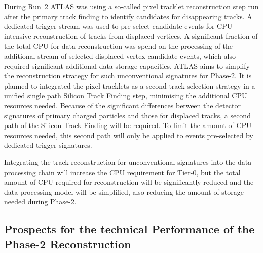During Run~2 ATLAS was using a so-called pixel tracklet reconstruction step run after the primary track finding to identify candidates for disappearing tracks. A dedicated trigger stream was used to pre-select candidate events for CPU intensive reconstruction of tracks from displaced vertices. A significant fraction of the total CPU for data reconstruction was spend on the processing of the additional stream of selected displaced vertex candidate events, which also required significant additional data storage capacities. ATLAS aims to simplify the reconstruction strategy for such unconventional signatures for Phase-2. It is planned to integrated the pixel tracklets as a second track selection strategy in a unified single path Silicon Track Finding step, minimising the additional CPU resources needed. Because of the significant differences between the detector signatures of primary charged particles and those for displaced tracks, a second path of the Silicon Track Finding will be required. To limit the amount of CPU resources needed, this second path will only be applied to events pre-selected by dedicated trigger signatures.

Integrating the track reconstruction for unconventional signatures into the data processing chain will increase the CPU requirement for Tier-0, but the total amount of CPU required for reconstruction will be significantly reduced and the data processing model will be simplified, also reducing the amount of storage needed during Phase-2.


\subsection{Prospects for the technical Performance of the Phase-2 Reconstruction}

